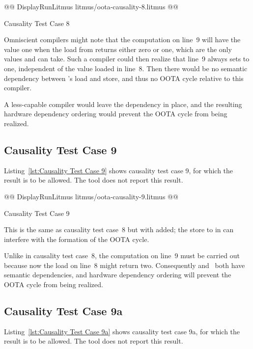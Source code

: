 \documentclass[10]{article}
\begin{document}
\begin{listing}[tbp]
@@ DisplayRunLitmus litmus/oota-causality-8.litmus @@
\caption{Causality Test Case 8}
\label{lst:Causality Test Case 8}
\end{listing}

Omniscient compilers might note that the computation on line~9
will have the value one when the load from  returns either
zero or one, which are the only values  and  can take.
Such a compiler could then realize that line~9 always sets  to one,
independent of the value loaded in line~8.
Then there would be no semantic dependency between 's load
and store, and thus no OOTA cycle relative to this compiler.

A less-capable compiler would leave the dependency in place,
and the resulting hardware dependency ordering would prevent
the OOTA cycle from being realized.

\subsection{Causality Test Case 9}
\label{app:Causality Test Case 9}

Listing~\ref{lst:Causality Test Case 9}
shows causality test case 9, for which the 
result is to be allowed.
The  tool does not report this result.

\begin{listing}[tbp]
@@ DisplayRunLitmus litmus/oota-causality-9.litmus @@
\caption{Causality Test Case 9}
\label{lst:Causality Test Case 9}
\end{listing}

This is the same as causality test case~8 but with  added;
the store to  in  can interfere with the formation of the
OOTA cycle.

Unlike in causality test case~8, the computation on line~9 must be
carried out because now the load on line~8 might return two.
Consequently  and~ both have semantic dependencies,
and hardware dependency ordering will prevent the OOTA cycle from
being realized.

\subsection{Causality Test Case 9a}
\label{app:Causality Test Case 9a}

Listing~\ref{lst:Causality Test Case 9a}
shows causality test case 9a, for which the 
result is to be allowed.
The  tool does not report this result.
\end{document}
